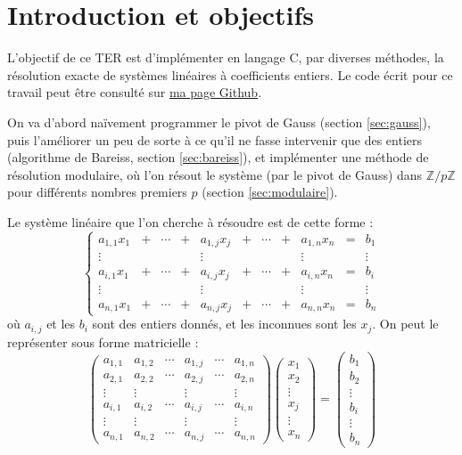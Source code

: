 \documentclass[french]{article}
\begin{document}
\section{Introduction et objectifs} \label{sec:intro}
L'objectif de ce TER est d'implémenter en langage C, par diverses méthodes, la résolution exacte de systèmes linéaires à coefficients entiers. Le code écrit pour ce travail peut être consulté sur \href{https://github.com/Barni072/TER}{ma page Github}.
\par On va d'abord naïvement programmer le pivot de Gauss (section \ref{sec:gauss}), puis l'améliorer un peu de sorte à ce qu'il ne fasse intervenir que des entiers (algorithme de Bareiss, section \ref{sec:bareiss}), et implémenter une méthode de résolution modulaire, où l'on résout le système (par le pivot de Gauss) dans $\mathbb{Z}/p\mathbb{Z}$ pour différents nombres premiers $p$ (section \ref{sec:modulaire}).
\par
Le système linéaire que l'on cherche à résoudre est de cette forme :
\newline
$$\left \{
\begin{array}{ccccccccccc}
	a_{1,1} x_1 &+ &\cdots &+ &a_{1,j} x_j &+ &\cdots &+ &a_{1,n} x_n &= & b_1\\
	\vdots & & & & \vdots & & & & \vdots & & \vdots\\
	a_{i,1} x_1 &+ &\cdots &+ &a_{i,j} x_j &+ &\cdots &+ &a_{i,n} x_n &= & b_i\\
	\vdots & & & & \vdots & & & & \vdots & & \vdots\\
	a_{n,1} x_1 &+ &\cdots &+ &a_{n,j} x_j &+ &\cdots &+ &a_{n,n} x_n &= & b_n
\end{array}
\right.
$$
où $a_{i,j}$ et les $b_i$ sont des entiers donnés, et les inconnues sont les $x_j$.
\newline
On peut le représenter sous forme matricielle :
\begin{equation*}
	\begin{pmatrix}
		a_{1,1} & a_{1,2} & \cdots & a_{1,j} & \cdots & a_{1,n}\\
		a_{2,1} & a_{2,2} & \cdots & a_{2,j} & \cdots & a_{2,n}\\
		\vdots  & \vdots  & & \vdots & & \vdots\\
		a_{i,1} & a_{i,2} & \cdots & a_{i,j} & \cdots & a_{i,n}\\
		\vdots  & \vdots  &  & \vdots & &\vdots\\
		a_{n,1} & a_{n,2} & \cdots & a_{n,j} & \cdots & a_{n,n}
	\end{pmatrix}
	\begin{pmatrix}
		x_1\\
		x_2\\
		\vdots\\
		x_j\\
		\vdots\\
		x_n
	\end{pmatrix}
	=
	\begin{pmatrix}
		b_1\\
		b_2\\
		\vdots\\
		b_i\\
		\vdots\\
		b_n
	\end{pmatrix}
\end{equation*}
\end{document}
